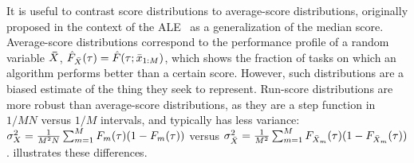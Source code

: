 It is useful to contrast score distributions to average-score distributions, originally proposed in the context of the ALE~\citep{bellemare2013arcade} as a generalization of the median score. Average-score distributions correspond to the performance profile of a random variable ${\bm\bar{X}}$,  $\hat{F}_{\bar X}(\tau) = \hat{F}(\tau; {\bar x}_{1:M})$, which shows the fraction of tasks on which an algorithm performs better than a certain score. However, such  distributions are a biased estimate of the thing they seek to represent. Run-score distributions are more robust than average-score distributions, as they are a step function in $1/MN$ versus $1/M$ intervals, and typically has less variance: $\sigma_X^2 = \tfrac{1}{M^2N} \sum_{m=1}^{M} F_{m}(\tau)(1 - F_{m}(\tau))$ versus $\sigma_{\bar X}^2 = \tfrac{1}{M^2}\sum_{m=1}^{M} F_{{\bar{X}_{m}}}(\tau)(1 - F_{{\bar{X}_{m}}}(\tau))$.  illustrates these differences.



